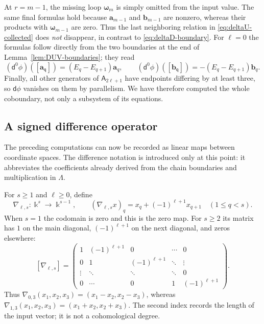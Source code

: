 \documentclass[a4paper,11pt,oneside,reqno]{amsart}
\theoremstyle{definition}
\numberwithin{equation}{section}
\begin{document}
	At $r=m-1$, the missing loop $\boldsymbol{\omega}_m$ is simply omitted from the input
	value.  The same final formulas hold because $\mathbf{a}_{m-1}$ and $\mathbf{b}_{m-1}$
	are nonzero, whereas their products with $\boldsymbol{\omega}_{m-1}$ are zero.
	Thus the last neighboring relation in
	\eqref{eq:deltaU-collected} does \emph{not} disappear, in contrast to
	\eqref{eq:deltaD-boundary}.
	For $\ell=0$ the formulas follow directly from the two boundaries at the
	end of Lemma~\ref{lem:DUV-boundaries}; they read
	\[
	(\mathsf d^0\phi)(\mathsf{[\mathbf{a}_q]})=(E_q-E_{q+1})\mathbf{a}_q,
	\qquad
	(\mathsf d^0\phi)(\mathsf{[\mathbf{b}_q]})=-(E_q-E_{q+1})\mathbf{b}_q.
	\]
	Finally, all other generators of $\mathsf A_{2\ell+1}$ have endpoints differing
	by at least three, so $\mathsf d\phi$ vanishes on them by parallelism.
	We have therefore computed the whole coboundary, not only a subsystem
	of its equations.
	
	\subsection{A signed difference operator}
	\label{subsec:nabla}
	
	The preceding computations can now be recorded as linear maps between
	coordinate spaces.  The difference notation is introduced only at this
	point: it abbreviates the coefficients already derived from the chain
	boundaries and multiplication in $\Lambda$.
	
	For $s\geq1$ and $\ell\geq0$, define
	\begin{equation}\label{eq:nabla-definition}
		\nabla_{\ell,s}:\Bbbk^s\longrightarrow \Bbbk^{s-1},\qquad
		(\nabla_{\ell,s}x)_q=x_q+(-1)^{\ell+1}x_{q+1}
		\quad(1\leq q<s).
	\end{equation}
	When $s=1$ the codomain is zero and this is the zero map.
	For $s\geq2$ its matrix has $1$ on the main diagonal,
	$(-1)^{\ell+1}$ on the next diagonal, and zeros elsewhere:
	\begin{equation}\label{eq:nabla-matrix}
		[\nabla_{\ell,s}]=
		\begin{pmatrix}
			1&(-1)^{\ell+1}&0&\cdots&0\\
			0&1&(-1)^{\ell+1}&\ddots&\vdots\\
			\vdots&\ddots&\ddots&\ddots&0\\
			0&\cdots&0&1&(-1)^{\ell+1}
		\end{pmatrix}.
	\end{equation}
	Thus $\nabla_{0,3}(x_1,x_2,x_3)=(x_1-x_2,x_2-x_3)$, whereas
	$\nabla_{1,3}(x_1,x_2,x_3)=(x_1+x_2,x_2+x_3)$.
	The second index records the length of the input vector; it is not a
	cohomological degree.
	
\end{document}

